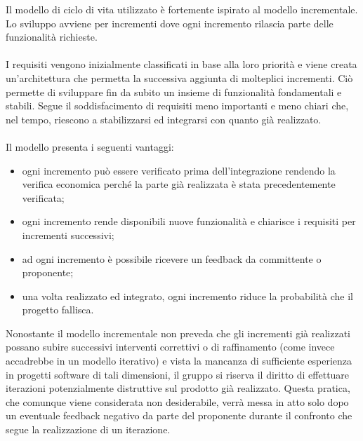 Il modello di ciclo di vita utilizzato è fortemente ispirato al modello
incrementale. Lo sviluppo avviene per incrementi dove ogni incremento rilascia parte delle funzionalità richieste.
\\\\
I requisiti vengono inizialmente classificati in base alla loro priorità e viene
creata un'architettura che permetta la successiva aggiunta di molteplici
incrementi. Ciò permette di sviluppare fin da subito un insieme di funzionalità
fondamentali e stabili. Segue il soddisfacimento di requisiti meno importanti e
meno chiari che, nel tempo, riescono a stabilizzarsi ed integrarsi con quanto già
realizzato.
\\\\
Il modello presenta i seguenti vantaggi:
\begin{itemize}
    \item ogni incremento può essere verificato prima dell'integrazione rendendo la verifica economica perché la parte già realizzata è stata precedentemente verificata;
    \item ogni incremento rende disponibili nuove funzionalità e chiarisce i requisiti per incrementi successivi;
    \item ad ogni incremento è possibile ricevere un feedback da committente o proponente;
    \item una volta realizzato ed integrato, ogni incremento riduce la probabilità che il progetto fallisca.
\end{itemize}

\noindent
Nonostante il modello incrementale non preveda che gli incrementi già realizzati
possano subire successivi interventi correttivi o di raffinamento (come invece
accadrebbe in un modello iterativo) e vista la mancanza di sufficiente esperienza
in progetti software di tali dimensioni, il gruppo si riserva il diritto di
effettuare iterazioni potenzialmente distruttive sul prodotto già realizzato.
Questa pratica, che comunque viene considerata non desiderabile, verrà messa in
atto solo dopo un eventuale feedback negativo da parte del proponente durante il
confronto che segue la realizzazione di un iterazione.
